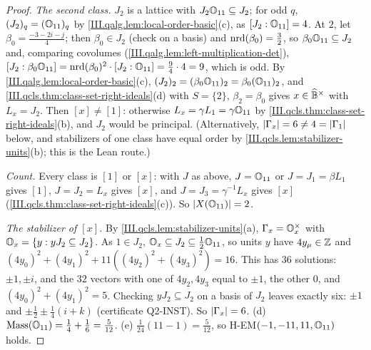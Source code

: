 \begin{proof}
\emph{The second class.} $J_2$ is a lattice with $J_2\mathbb{O}_{11}\subseteq J_2$; for odd $q$, $(J_2)_q=(\mathbb{O}_{11})_q$ by \cref{III.qalg.lem:local-order-basic}(c),
as $[J_2:\mathbb{O}_{11}]=4$. At $2$, let $\beta_0=\frac{-3-2i-j}4$; then $\beta_0\in J_2$ (check on a basis) and $\operatorname{nrd}(\beta_0)=\frac32$, so $\beta_0\mathbb{O}_{11}\subseteq J_2$
and, comparing covolumes (\cref{III.qalg.lem:left-multiplication-det}), $[J_2:\beta_0\mathbb{O}_{11}]=\operatorname{nrd}(\beta_0)^2\cdot[J_2:\mathbb{O}_{11}]=\frac94\cdot4=9$, which is odd.
By \cref{III.qalg.lem:local-order-basic}(c), $(J_2)_2=(\beta_0\mathbb{O}_{11})_2=\beta_0(\mathbb{O}_{11})_2$, and \cref{III.qcls.thm:class-set-right-ideals}(d) with
$S=\{2\}$, $\beta_2=\beta_0$ gives $x\in\widehat{\mathbb{B}}^\times$ with $L_x=J_2$. Then $[x]\ne[1]$: otherwise $L_x=\gamma L_1=\gamma\mathbb{O}_{11}$
by \cref{III.qcls.thm:class-set-right-ideals}(b), and $J_2$ would be principal. (Alternatively, $\lvert\Gamma_x\rvert=6\ne4=\lvert\Gamma_1\rvert$ below, and stabilizers of
one class have equal order by \cref{III.qcls.lem:stabilizer-units}(b); this is the Lean route.)

\emph{Count.} Every class is $[1]$ or $[x]$: with $J$ as above, $J=\mathbb{O}_{11}$ or $J=J_1=\beta L_1$ gives $[1]$, $J=J_2=L_x$ gives $[x]$, and
$J=J_3=\gamma^{-1}L_x$ gives $[x]$ (\cref{III.qcls.thm:class-set-right-ideals}(c)). So $\lvert X(\mathbb{O}_{11})\rvert=2$.

\emph{The stabilizer of $[x]$.} By \cref{III.qcls.lem:stabilizer-units}(a), $\Gamma_x=\mathbb{O}_x^\times$ with $\mathbb{O}_x=\{y:yJ_2\subseteq J_2\}$. As $1\in J_2$,
$\mathbb{O}_x\subseteq J_2\subseteq\frac12\mathbb{O}_{11}$, so units $y$ have $4y_\mu\in\mathbb{Z}$ and $(4y_0)^2+(4y_1)^2+11((4y_2)^2+(4y_3)^2)=16$. This has $36$ solutions: $\pm1,\pm i$, and the $32$ vectors with one of $4y_2,4y_3$ equal to
$\pm1$, the other $0$, and $(4y_0)^2+(4y_1)^2=5$. Checking $yJ_2\subseteq J_2$ on
a basis of $J_2$ leaves exactly six: $\pm1$ and $\pm\frac12\pm\frac14(i+k)$ (certificate Q2-INST). So $\lvert\Gamma_x\rvert=6$.
(d) $\operatorname{Mass}(\mathbb{O}_{11})=\frac14+\frac16=\frac5{12}$. (e) $\frac1{24}(11-1)=\frac5{12}$, so H-EM$(-1,-11,11,\mathbb{O}_{11})$ holds.
\end{proof}

